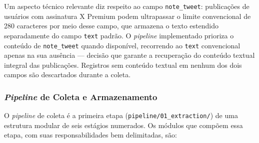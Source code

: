 Um aspecto técnico relevante diz respeito ao campo \texttt{note\_tweet}: publicações de usuários com assinatura X Premium podem ultrapassar o limite convencional de 280 caracteres por meio desse campo, que armazena o texto estendido separadamente do campo \texttt{text} padrão. O \textit{pipeline} implementado prioriza o conteúdo de \texttt{note\_tweet} quando disponível, recorrendo ao \texttt{text} convencional apenas na sua ausência — decisão que garante a recuperação do conteúdo textual integral das publicações. Registros sem conteúdo textual em nenhum dos dois campos são descartados durante a coleta.

\subsubsection{\textit{Pipeline} de Coleta e Armazenamento}
\label{subsubsec:pipeline_coleta}

O \textit{pipeline} de coleta é a primeira etapa (\texttt{pipeline/01\_extraction/}) de uma estrutura modular de seis estágios numerados. Os módulos que compõem essa etapa, com suas
responsabilidades bem delimitadas, são:

